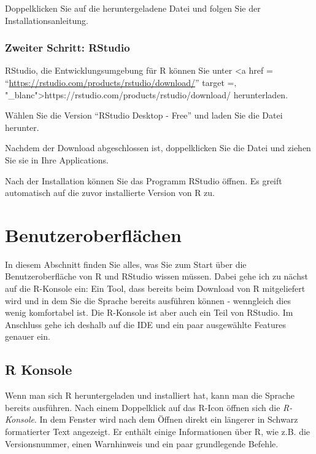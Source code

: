 \documentclass[
]{book}
\begin{document}
Doppelklicken Sie auf die heruntergeladene Datei und folgen Sie der Installationsanleitung.

\hypertarget{zweiter-schritt-rstudio-1}{%
\subsection{Zweiter Schritt: RStudio}\label{zweiter-schritt-rstudio-1}}

RStudio, die Entwicklungsumgebung für R können Sie unter \textless a href = ``\url{https://rstudio.com/products/rstudio/download/}'' target =‚ "\_blanc"\textgreater https://rstudio.com/products/rstudio/download/ herunterladen.

Wählen Sie die Version ``RStudio Desktop - Free'' und laden Sie die Datei herunter.

Nachdem der Download abgeschlossen ist, doppelklicken Sie die Datei und ziehen Sie sie in Ihre Applications.

Nach der Installation können Sie das Programm RStudio öffnen. Es greift automatisch auf die zuvor installierte Version von R zu.

\hypertarget{benutzeroberfluxe4chen}{%
\chapter{Benutzeroberflächen}\label{benutzeroberfluxe4chen}}

In diesem Abschnitt finden Sie alles, was Sie zum Start über die Benutzeroberfläche von R und RStudio wissen müssen. Dabei gehe ich zu nächst auf die R-Konsole ein: Ein Tool, dass bereits beim Download von R mitgeliefert wird und in dem Sie die Sprache bereits ausführen können - wenngleich dies wenig komfortabel ist. Die R-Konsole ist aber auch ein Teil von RStudio. Im Anschluss gehe ich deshalb auf die IDE und ein paar ausgewählte Features genauer ein.

\hypertarget{konsole}{%
\section{R Konsole}\label{konsole}}

Wenn man sich R heruntergeladen und installiert hat, kann man die Sprache bereits ausführen.
Nach einem Doppelklick auf das R-Icon öffnen sich die \emph{R-Konsole}.
In dem Fenster wird nach dem Öffnen direkt ein längerer in Schwarz formatierter Text angezeigt.
Er enthält einige Informationen über R, wie z.B. die Versionsnummer, einen Warnhinweis und ein paar grundlegende Befehle.
\end{document}
